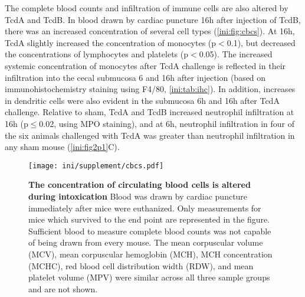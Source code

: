 The complete blood counts and infiltration of immune cells are also altered 
by TcdA and TcdB. In blood drawn by cardiac puncture 16h after injection 
of TcdB, there was an increased concentration of several cell types 
(\autoref{ini:fig:cbcs}). At 16h, TcdA slightly increased the concentration 
of monocytes (p$<$0.1), but decreased the concentrations of lymphocytes 
and platelets (p$<$0.05). The increased systemic concentration of 
monocytes after TcdA challenge is reflected in their infiltration into 
the cecal submucosa 6 and 16h after injection (based on immunohistochemistry 
staining using F4/80, \autoref{ini:tab:ihc}). In addition, increases in 
dendritic cells were also evident in the submucosa 6h and 16h after TcdA 
challenge. Relative to sham, TcdA and TcdB increased neutrophil 
infiltration at 16h (p$\leq$0.02, using MPO staining), and at 6h, 
neutrophil infiltration in four of the six animals challenged with TcdA 
was greater than neutrophil infiltration in any sham mouse (\autoref{ini:fig2p1}C).


\begin{figure}
\centering
\texttt{[image: ini/supplement/cbcs.pdf]}
\caption[The concentration of circulating
blood cells was altered during intoxication]
      {\textbf{The concentration of circulating
           blood cells is altered during intoxication}
           Blood was drawn by cardiac puncture immediately after mice were euthanized.
Only measurements for mice which survived to the end point are represented
in the figure. Sufficient blood to measure complete blood counts was not 
capable of being drawn from every mouse. The mean corpuscular volume (MCV), 
mean corpuscular hemoglobin (MCH), MCH concentration (MCHC), red blood
cell distribution width (RDW), and mean platelet volume (MPV) were
similar across all three sample groups and are not shown.
           }
\label{ini:fig:cbcs}
\end{figure}

